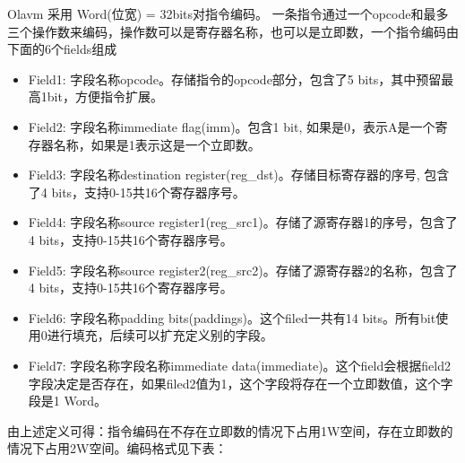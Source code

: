 Olavm 采用 Word(位宽) = 32bits对指令编码。
一条指令通过一个opcode和最多三个操作数来编码，操作数可以是寄存器名称，也可以是立即数，一个指令编码由下面的6个fields组成
\begin{itemize}
    \item Field1: 字段名称opcode。存储指令的opcode部分，包含了5 bits，其中预留最高1bit，方便指令扩展。
    \item Field2: 字段名称immediate flag(imm)。包含1 bit, 如果是0，表示A是一个寄存器名称，如果是1表示这是一个立即数。
    \item Field3: 字段名称destination register(reg\_dst)。存储目标寄存器的序号, 包含了4 bits，支持0-15共16个寄存器序号。
    \item Field4: 字段名称source register1(reg\_src1)。存储了源寄存器1的序号，包含了4 bits，支持0-15共16个寄存器序号。
    \item Field5: 字段名称source register2(reg\_src2)。存储了源寄存器2的名称，包含了4 bits，支持0-15共16个寄存器序号。
    \item Field6: 字段名称padding bits(paddings)。这个filed一共有14 bits。所有bit使用0进行填充，后续可以扩充定义别的字段。
    \item Field7: 字段名称字段名称immediate data(immediate)。这个field会根据field2字段决定是否存在，如果filed2值为1，这个字段将存在一个立即数值，这个字段是1 Word。
\end{itemize}

由上述定义可得：指令编码在不存在立即数的情况下占用1W空间，存在立即数的情况下占用2W空间。编码格式见下表：

\begin{table}[!ht]
    \centering {}
    \caption{OlaVM指令编码格式}
    \label{table: processor_instruction_decode}
\end{table}

